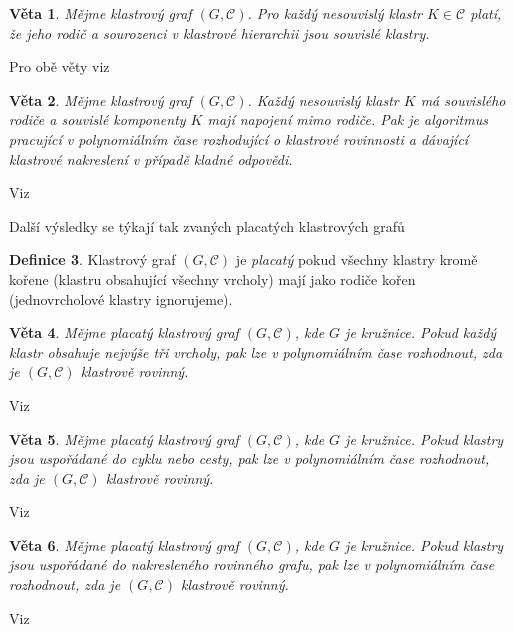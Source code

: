\documentclass[12pt,a4report]{report}
\newtheorem{theorem}{Věta}[chapter]
\theoremstyle{definition}
\newtheorem{defn}[theorem]{Definice}
\begin{document}
\begin{theorem}
Mějme klastrový graf $(G, \mathcal C)$. Pro každý nesouvislý klastr $K \in \mathcal C$ platí, že jeho rodič a sourozenci v klastrové hierarchii jsou souvislé klastry.
\end{theorem}

Pro obě věty viz \cite{GutwengerEtAl02}

\begin{theorem}
Mějme klastrový graf $(G, \mathcal C)$. Každý nesouvislý klastr $K$ má souvislého rodiče a souvislé komponenty $K$ mají napojení mimo rodiče. Pak je algoritmus pracující v polynomiálním čase rozhodující o klastrové rovinnosti a dávající klastrové nakreslení v případě kladné odpovědi.
\end{theorem}

Viz \cite{GoodrichEtAl05}

Další výsledky se týkají tak zvaných placatých klastrových grafů

\begin{defn}
Klastrový graf $(G, \mathcal C)$ je \textit{placatý} pokud všechny klastry kromě kořene (klastru obsahující všechny vrcholy) mají jako rodiče kořen (jednovrcholové klastry ignorujeme).
\end{defn}

\begin{theorem}
Mějme placatý klastrový graf  $(G, \mathcal C)$, kde $G$ je kružnice. Pokud každý klastr obsahuje nejvýše tři vrcholy, pak lze v polynomiálním čase rozhodnout, zda je  $(G, \mathcal C)$ klastrově rovinný.
\end{theorem}

Viz \cite{JelinkovaEtAl07}

\begin{theorem}
Mějme placatý klastrový graf  $(G, \mathcal C)$, kde $G$ je kružnice. Pokud klastry jsou uspořádané do cyklu nebo cesty, pak lze v polynomiálním čase rozhodnout, zda je  $(G, \mathcal C)$ klastrově rovinný.
\end{theorem}

Viz \cite{CorteseEtAl04}

\begin{theorem}
Mějme placatý klastrový graf  $(G, \mathcal C)$, kde $G$ je kružnice. Pokud klastry jsou uspořádané do nakresleného rovinného grafu, pak lze v polynomiálním čase rozhodnout, zda je  $(G, \mathcal C)$ klastrově rovinný.
\end{theorem}

Viz \cite{CorteseEtAl09}
\end{document}
